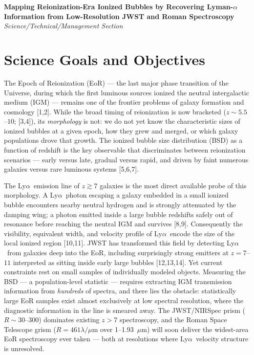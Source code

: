 \documentclass[12pt,letterpaper]{article}
\newcommand{\lya}{Ly$\alpha$}
\begin{document}
\begin{center}
{\large\bfseries Mapping Reionization-Era Ionized Bubbles by Recovering
Lyman-$\alpha$ Information from Low-Resolution JWST and Roman
Spectroscopy}\\[2pt]
{\itshape Science/Technical/Management Section}
\end{center}

\section{Science Goals and Objectives}
\label{sec:goals}

The Epoch of Reionization (EoR) --- the last major phase transition of
the Universe, during which the first luminous sources ionized the neutral
intergalactic medium (IGM) --- remains one of the frontier problems of
galaxy formation and cosmology [1,2]. While the broad timing of
reionization is now bracketed ($z\sim5.5$--$10$; [3,4]), its
\emph{morphology} is not: we do not yet know the characteristic sizes of
ionized bubbles at a given epoch, how they grew and merged, or which
galaxy populations drove that growth. The ionized bubble size
distribution (BSD) as a function of redshift is the key observable that
discriminates between reionization scenarios --- early versus late,
gradual versus rapid, and driven by faint numerous galaxies versus rare
luminous systems [5,6,7].

The \lya\ emission line of $z\gtrsim7$ galaxies is the most direct
available probe of this morphology. A \lya\ photon escaping a galaxy
embedded in a small ionized bubble encounters nearby neutral hydrogen and
is strongly attenuated by the damping wing; a photon emitted inside a
large bubble redshifts safely out of resonance before reaching the
neutral IGM and survives [8,9]. Consequently the visibility, equivalent
width, and velocity profile of \lya\ encode the size of the local ionized
region [10,11]. JWST has transformed this field by detecting \lya\ from
galaxies deep into the EoR, including surprisingly strong emitters at
$z=7$--$11$ interpreted as sitting inside early large bubbles [12,13,14].
Yet current constraints rest on small samples of individually modeled
objects. Measuring the BSD --- a population-level statistic --- requires
extracting IGM transmission information from \emph{hundreds} of spectra,
and there lies the obstacle: statistically large EoR samples exist almost
exclusively at low spectral resolution, where the diagnostic information
in the line is smeared away. The JWST/NIRSpec prism ($R\sim30$--$300$)
dominates existing $z>7$ spectroscopy, and the Roman Space Telescope
grism ($R=461\lambda/\mu$m over 1--1.93~$\mu$m) will soon deliver the
widest-area EoR spectroscopy ever taken --- both at resolutions where
\lya\ velocity structure is unresolved.
\end{document}
